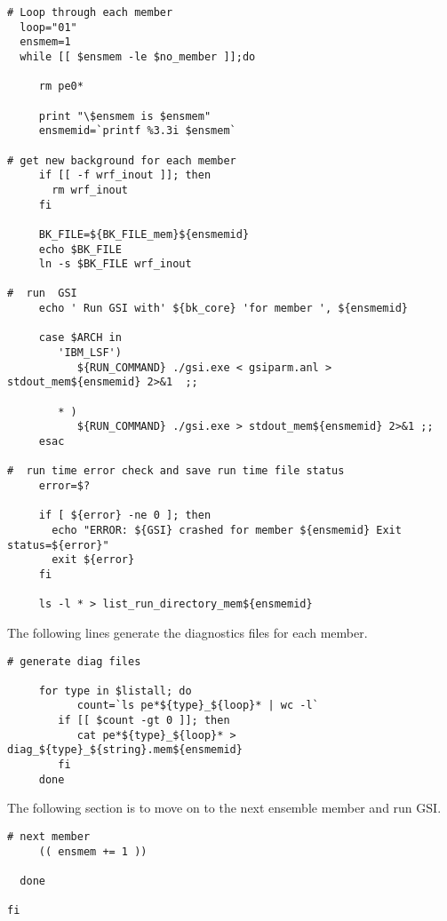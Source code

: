 \begin{footnotesize}
\begin{verbatim}
# Loop through each member
  loop="01"
  ensmem=1
  while [[ $ensmem -le $no_member ]];do

     rm pe0*

     print "\$ensmem is $ensmem"
     ensmemid=`printf %3.3i $ensmem`

# get new background for each member
     if [[ -f wrf_inout ]]; then
       rm wrf_inout
     fi

     BK_FILE=${BK_FILE_mem}${ensmemid}
     echo $BK_FILE
     ln -s $BK_FILE wrf_inout

#  run  GSI
     echo ' Run GSI with' ${bk_core} 'for member ', ${ensmemid}

     case $ARCH in
        'IBM_LSF')
           ${RUN_COMMAND} ./gsi.exe < gsiparm.anl > stdout_mem${ensmemid} 2>&1  ;;

        * )
           ${RUN_COMMAND} ./gsi.exe > stdout_mem${ensmemid} 2>&1 ;;
     esac

#  run time error check and save run time file status
     error=$?

     if [ ${error} -ne 0 ]; then
       echo "ERROR: ${GSI} crashed for member ${ensmemid} Exit status=${error}"
       exit ${error}
     fi

     ls -l * > list_run_directory_mem${ensmemid}
\end{verbatim}
\end{footnotesize}

The following lines generate the diagnostics files for each member.

\begin{small}
\begin{verbatim}
# generate diag files

     for type in $listall; do
           count=`ls pe*${type}_${loop}* | wc -l`
        if [[ $count -gt 0 ]]; then
           cat pe*${type}_${loop}* > diag_${type}_${string}.mem${ensmemid}
        fi
     done
\end{verbatim}
\end{small}

The following section is to move on to the next ensemble member and run GSI.

\begin{small}
\begin{verbatim}
# next member
     (( ensmem += 1 ))

  done

fi
\end{verbatim}
\end{small}


